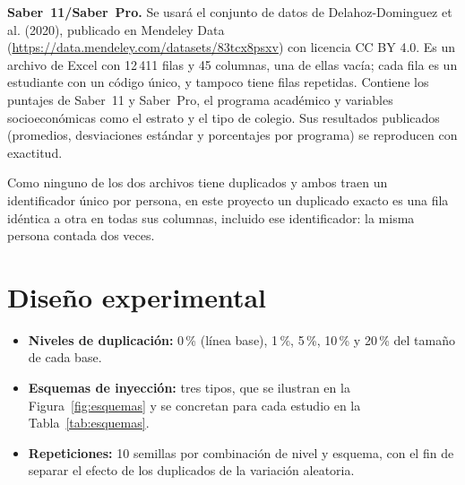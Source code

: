 \documentclass[11pt,openany,oneside,letterpaper]{book}
\begin{document}
\textbf{Saber~11/Saber~Pro.} Se usará el conjunto de datos de Delahoz-Dominguez et al. (2020), publicado en Mendeley Data (\url{https://data.mendeley.com/datasets/83tcx8psxv}) con licencia CC BY 4.0. Es un archivo de Excel con 12\,411 filas y 45 columnas, una de ellas vacía; cada fila es un estudiante con un código único, y tampoco tiene filas repetidas. Contiene los puntajes de Saber~11 y Saber~Pro, el programa académico y variables socioeconómicas como el estrato y el tipo de colegio. Sus resultados publicados (promedios, desviaciones estándar y porcentajes por programa) se reproducen con exactitud.

Como ninguno de los dos archivos tiene duplicados y ambos traen un identificador único por persona, en este proyecto un duplicado exacto es una fila idéntica a otra en todas sus columnas, incluido ese identificador: la misma persona contada dos veces.

\section{Diseño experimental}

\begin{itemize}
 \item \textbf{Niveles de duplicación:} 0\,\% (línea base), 1\,\%, 5\,\%, 10\,\% y 20\,\% del tamaño de cada base.
 \item \textbf{Esquemas de inyección:} tres tipos, que se ilustran en la Figura~\ref{fig:esquemas} y se concretan para cada estudio en la Tabla~\ref{tab:esquemas}.
 \item \textbf{Repeticiones:} 10 semillas por combinación de nivel y esquema, con el fin de separar el efecto de los duplicados de la variación aleatoria.
\end{itemize}
\end{document}
